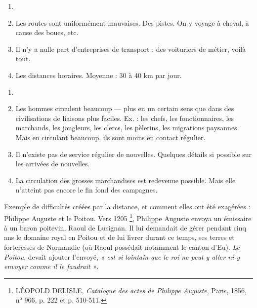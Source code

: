 \documentclass[french,twoside]{book} %
\newcommand\chapteropen{} %
\newcommand\chapterclose{} %
\renewcommand\chapteropen{} %
\renewcommand\chapterclose{} %
\begin{document}
\begin{enumerate}[itemsep=0pt,]
\item[] \hspace{-1.5em}{\bfseries Précisons :}
\item Les routes sont uniformément mauvaises. Des pistes. On y voyage à cheval, à cause des boues, etc.
\item Il n’y a nulle part d’entreprises de transport : des voituriers de métier, voilà tout.
\item Les distances horaires. Moyenne : 30 à 40 km par jour.

\end{enumerate}
\begin{enumerate}[itemsep=0pt,]
\item[] \hspace{-1.5em}{\bfseries Caractère de la circulation :}
\item Les hommes circulent beaucoup — plus en un certain sens que dans des civilisations de liaisons plus faciles. Ex. : les chefs, les fonctionnaires, les marchands, les jongleurs, les clercs, les pèlerins, les migrations paysannes. Mais en circulant beaucoup, ils sont moins en contact régulier.
\item Il n’existe pas de service régulier de nouvelles. Quelques détails si possible sur les arrivées de nouvelles.
\item La circulation des grosses marchandises est redevenue possible. Mais elle n’atteint pas encore le fin fond des campagnes.

\end{enumerate}\noindent Exemple de difficultés créées par la distance, et comment elles ont été exagérées : Philippe Auguste et le Poitou. Vers 1205 \footnote{ LÉOPOLD DELISLE, {\itshape Catalogue des actes de Philippe Auguste}, Paris, 1856, n° 966, p. 222 et p. 510-511.}, Philippe Auguste envoya un émissaire à un baron poitevin, Raoul de Lusignan. Il lui demandait de gérer pendant cinq ans le domaine royal en Poitou et de lui livrer durant ce temps, ses terres et forteresses de Normandie (où Raoul possédait notamment le canton d’Eu). \emph{Le Poitou}, devait ajouter l’envoyé, \emph{« est si lointain que le roi ne peut y aller ni y envoyer comme il le faudrait »}.
\chapterclose


\chapteropen
\end{document}
